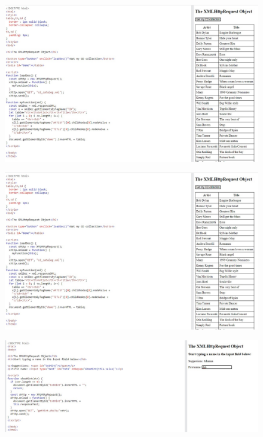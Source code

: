 \documentclass{article}
\begin{document}
\begin{itemize}
		\begin{figure}[H]
			\centering
			\includegraphics[width=1.0\textwidth,keepaspectratio]{img/A15.jpg}
		\end{figure}
		\begin{figure}[H]
			\centering
			\includegraphics[width=1.0\textwidth,keepaspectratio]{img/A16.jpg}
		\end{figure}
		\begin{figure}[H]
			\centering
			\includegraphics[width=1.0\textwidth,keepaspectratio]{img/A17.jpg}

\end{figure}
\end{itemize}
\end{document}
